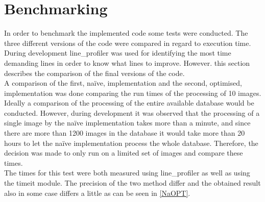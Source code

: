 \section{Benchmarking}
In order to benchmark the implemented code some tests were conducted. The three different versions of the code were compared in regard to execution time. During development line_profiler was used for identifying the most time demanding lines in order to know what lines to improve. However. this section describes the comparison of the final versions of the code.\\
A comparison of the first, na\"ive, implementation and the second, optimised, implementation was done comparing the run times of the processing of 10 images. Ideally a comparison of the processing of the entire available database would be conducted. However, during development it was observed that the processing of a single image by the na\"ive implementation takes more than a minute, and since there are more than 1200 images in the database it would take more than 20 hours to let the na\"ive implementation process the whole database. Therefore, the decision was made to only run on a limited set of images and compare these times. \\
The times for this test were both measured using line_profiler as well as using the timeit module. The precision of the two method differ and the obtained result also in some case differs a little as can be seen in \autoref{NaOPT}.  

